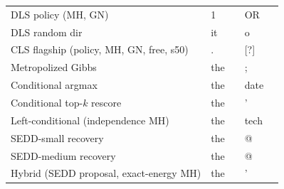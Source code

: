 \begin{center}
\begin{longtable}{p{} p{} c p{} c}
\addlinespace[2pt]
DLS policy (MH, GN) & 1 & & OR & \\
DLS random dir & it & & o & \\
CLS flagship (policy, MH, GN, free, s50) & . & & [?] & \\
Metropolized Gibbs & the & & ; & \\
Conditional argmax & the & & date & \\
Conditional top-$k$ rescore & the & & ' & \\
Left-conditional (independence MH) & the & & tech & \\
SEDD-small recovery & the & & @ & \\
SEDD-medium recovery & the & & @ & \\
Hybrid (SEDD proposal, exact-energy MH) & the & & ' & \\
\midrule

\end{longtable}\end{center}

